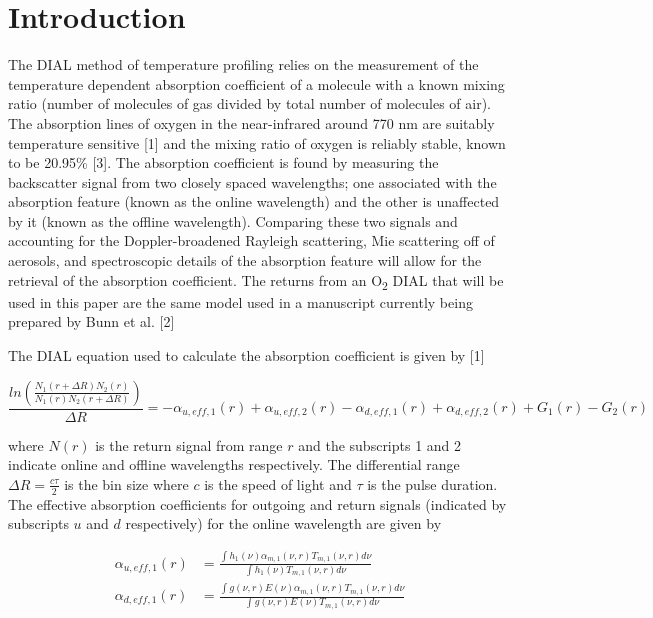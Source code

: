 \documentclass[twoside]{article}
\begin{document}
\section{Introduction}
The DIAL method of temperature profiling relies on the measurement of the temperature dependent absorption coefficient of a molecule with a known mixing ratio (number of molecules of gas divided by total number of molecules of air). 
The absorption lines of oxygen in the near-infrared around 770 nm are suitably temperature sensitive [1] and the mixing ratio of oxygen is reliably stable, known to be 20.95\% [3]. 
The absorption coefficient is found by measuring the backscatter signal from two closely spaced wavelengths; one associated with the absorption feature (known as the online wavelength) and the other is unaffected by it (known as the offline wavelength). 
Comparing these two signals and accounting for the Doppler-broadened Rayleigh scattering, Mie scattering off of aerosols, and spectroscopic details of the absorption feature will allow for the retrieval of the absorption coefficient. 
The returns from an O\textsubscript{2} DIAL that will be used in this paper are the same model used in a manuscript currently being prepared by Bunn et al. [2]\\
\par
\noindent The DIAL equation used to calculate the absorption coefficient is given by [1]

\begin{equation}
	\frac{ln\left(\frac{N_1(r+\Delta R) N_2(r)}{N_1(r) N_2(r+\Delta R)}\right)}{\Delta R} = -\alpha_{u,eff,1}(r) + \alpha_{u,eff,2}(r) -\alpha_{d,eff,1}(r) +\alpha_{d,eff,2}(r) + G_1(r) - G_2(r)
\end{equation}

\noindent where $N(r)$ is the return signal from range $r$ and the subscripts 1 and 2 indicate online and offline wavelengths respectively. 
The differential range $\Delta R = \frac{c \tau}{2}$ is the bin size where $c$ is the speed of light and $\tau$ is the pulse duration. 
The effective absorption coefficients for outgoing and return signals (indicated by subscripts $u$ and $d$ respectively) for the online wavelength are given by

\begin{align}
	\alpha_{u,eff,1}(r) &= \frac{\int h_1(\nu) \alpha_{m,1}(\nu,r) T_{m,1}(\nu,r) d\nu}{\int h_1(\nu) T_{m,1}(\nu,r) d\nu}\\
	\alpha_{d,eff,1}(r) &= \frac{\int g(\nu,r) E(\nu) \alpha_{m,1}(\nu,r) T_{m,1}(\nu,r) d\nu}{\int g(\nu,r) E(\nu) T_{m,1}(\nu,r) d\nu}
\end{align}
\end{document}
